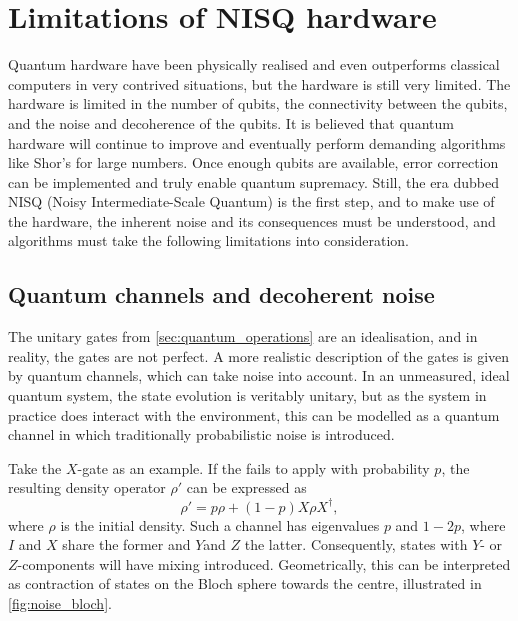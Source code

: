 \section{Limitations of NISQ hardware}
Quantum hardware have been physically realised and even outperforms classical computers in very contrived situations, but the hardware is still very limited.
The hardware is limited in the number of qubits, the connectivity between the qubits, and the noise and decoherence of the qubits.
It is believed that quantum hardware will continue to improve and eventually perform demanding algorithms like Shor's for large numbers.
Once enough qubits are available, error correction can be implemented and truly enable quantum supremacy.
Still, the era dubbed NISQ (Noisy Intermediate-Scale Quantum) is the first step, and to make use of the hardware, the inherent noise and its consequences must be understood, and algorithms must take the following limitations into consideration.

\subsection{Quantum channels and decoherent noise}
The unitary gates from \cref{sec:quantum_operations} are an idealisation, and in reality, the gates are not perfect.
A more realistic description of the gates is given by quantum channels, which can take noise into account.
In an unmeasured, ideal quantum system, the state evolution is veritably unitary, but as the system in practice does interact with the environment, this can be modelled as a quantum channel in which traditionally probabilistic noise is introduced.

Take the $X$-gate as an example.
If the fails to apply with probability $p$, the resulting density operator $\rho'$ can be expressed as
\begin{equation}
    \rho' = p\rho + (1-p)X\rho X^\dagger,
\end{equation}
where $\rho$ is the initial density.
Such a channel has eigenvalues $p$ and $1-2p$, where $I$ and $X$ share the former and $Y$and $Z$ the latter.
Consequently, states with $Y$- or $Z$-components will have mixing introduced.
Geometrically, this can be interpreted as contraction of states on the Bloch sphere towards the centre, illustrated in \cref{fig:noise_bloch}.

